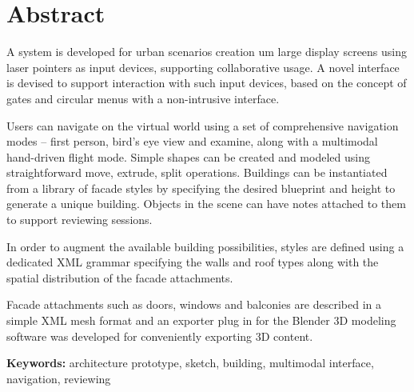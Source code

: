 \chapter*{Abstract}





A system is developed for urban scenarios creation um large display screens using laser
pointers as input devices, supporting collaborative usage.
A novel interface is devised to support interaction with such input devices,
based on the concept of gates and circular menus with a non-intrusive interface.



Users can navigate on the virtual world using a set of comprehensive navigation modes
-- first person, bird's eye view and examine, along with a multimodal hand-driven flight mode.
Simple shapes can be created and modeled using straightforward move, extrude, split operations.
Buildings can be instantiated from a library of facade styles by specifying
the desired blueprint and height to generate a unique building.
Objects in the scene can have notes attached to them to support reviewing sessions.

In order to augment the available building possibilities, styles are defined using a dedicated XML grammar
specifying the walls and roof types along with the spatial distribution of the facade attachments.

Facade attachments such as doors, windows and balconies are described in
a simple XML mesh format and an exporter plug in for the Blender 3D modeling software was developed
for conveniently exporting 3D content.







\textbf{Keywords:} architecture prototype, sketch, building, multimodal interface, navigation, reviewing
